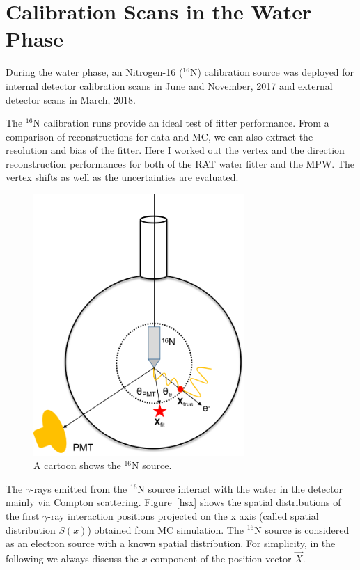 \section{ Calibration Scans in the Water Phase}
During the water phase, an Nitrogen-16 ($^{16}$N) calibration source was deployed for internal detector calibration scans in June and November, 2017 and external detector scans in March, 2018.

The $^{16}$N calibration runs provide an ideal test of fitter performance. From a comparison of reconstructions for data and MC, we can also extract the resolution and bias of the fitter. Here I worked out the vertex and the direction reconstruction performances for both of the RAT water fitter and the MPW. The vertex shifts as well as the uncertainties are evaluated. 

\begin{figure}[!htb]
	\centering
	\includegraphics[width=8cm]{N16centralDiagram.png}
	\caption{A cartoon shows the $^{16}$N source.}
	\label{N16centralDiagram}
\end{figure}



The $\gamma$-rays emitted from the $^{16}$N source interact with the water in the detector mainly via Compton scattering. Figure~\ref{hsx} shows the spatial distributions of the first $\gamma$-ray interaction positions projected on the x axis (called spatial distribution $S(x)$) obtained from MC simulation. The $^{16}$N source is considered as an electron source with a known spatial distribution\cite{boulay2004direct}. For simplicity, in the following we always discuss the $x$ component of the position vector $\vec{X}$. 

